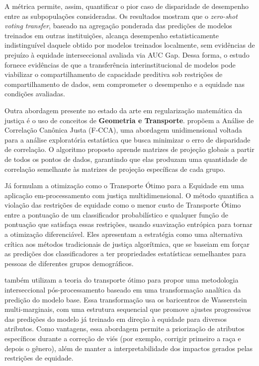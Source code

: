 A métrica permite, assim, quantificar o pior caso de disparidade de desempenho entre as subpopulações consideradas. Os resultados mostram que o \textit{zero-shot voting transfer}, baseado na agregação ponderada das predições de modelos treinados em outras instituições, alcança desempenho estatisticamente indistinguível daquele obtido por modelos treinados localmente, sem evidências de prejuízo à equidade interseccional avaliada via AUC Gap. Dessa forma, o estudo fornece evidências de que a transferência interinstitucional de modelos pode viabilizar o compartilhamento de capacidade preditiva sob restrições de compartilhamento de dados, sem comprometer o desempenho e a equidade nas condições avaliadas.

Outra abordagem presente no estado da arte em regularização matemática da justiça é o uso de conceitos de \textbf{Geometria e Transporte}.  \citet{zhou2023fair} propõem a Análise de Correlação Canônica Justa (F-CCA), uma abordagem unidimensional voltada para a análise exploratória estatística que busca minimizar o erro de disparidade de correlação. O algoritmo proposto aprende matrizes de projeção globais a partir de todos os pontos de dados, garantindo que elas produzam uma quantidade de correlação semelhante às matrizes de projeção específicas de cada grupo.

Já \citet{buyl2022optimal} formulam a otimização como o Transporte Ótimo para a Equidade em uma aplicação em-processamento com justiça multidimensional. O método quantifica a violação das restrições de equidade como o menor custo de Transporte Ótimo entre a pontuação de um classificador probabilístico e qualquer função de pontuação que satisfaça essas restrições, usando suavização entrópica para tornar a otimização diferenciável. Eles apresentam a estratégia como uma alternativa crítica aos métodos tradicionais de justiça algorítmica, que se baseiam em forçar as predições dos classificadores a ter propriedades estatísticas semelhantes para pessoas de diferentes grupos demográficos.

\citet{hu2024sequentially} também utilizam a teoria do transporte ótimo para propor uma metodologia interseccional pós-processamento baseado em uma transformação analítica da predição do modelo base. Essa transformação usa os baricentros de Wasserstein multi-marginais,
com uma estrutura sequencial que promove ajustes progressivos das predições do modelo já treinado em direção à equidade para diversos atributos. Como vantagens, essa abordagem permite a priorização de atributos específicos durante a correção de viés (por exemplo, corrigir primeiro a raça e depois o gênero), além de manter a interpretabilidade dos impactos gerados pelas restrições de equidade.

